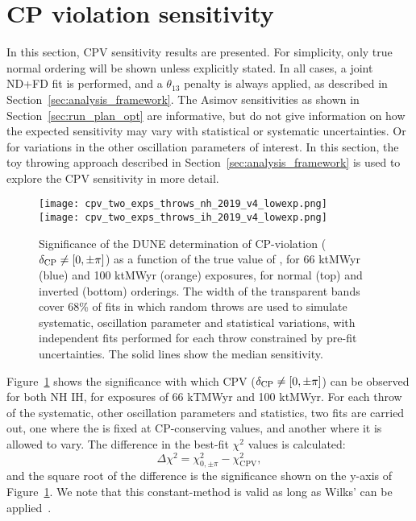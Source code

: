 \FloatBarrier
\section{CP violation sensitivity}
\label{sec:cp_sens}

In this section, CPV sensitivity results are presented. For simplicity, only true normal ordering will be shown unless explicitly stated. In all cases, a joint ND+FD fit is performed, and a $\theta_{13}$ penalty is always applied, as described in Section~\ref{sec:analysis_framework}. The Asimov sensitivities as shown in Section~\ref{sec:run_plan_opt} are informative, but do not give information on how the expected sensitivity may vary with statistical or systematic uncertainties. Or for variations in the other oscillation parameters of interest. In this section, the toy throwing approach described in Section~\ref{sec:analysis_framework} is used to explore the CPV sensitivity in more detail.

\begin{figure}[htbp]
  \centering
  \texttt{[image: cpv\_two\_exps\_throws\_nh\_2019\_v4\_lowexp.png]}\\
  \texttt{[image: cpv\_two\_exps\_throws\_ih\_2019\_v4\_lowexp.png]}
  \caption{Significance of the DUNE determination of CP-violation ($\delta_{\rm CP} \neq [0,\pm\pi]$) as a function of the true value of \deltacp, for 66 ktMWyr (blue) and 100 ktMWyr (orange) exposures, for normal (top) and inverted (bottom) orderings. The width of the transparent bands cover 68\% of fits in which random throws are used to simulate systematic, oscillation parameter and statistical variations, with independent fits performed for each throw constrained by pre-fit uncertainties. The solid lines show the median sensitivity.}
  \label{fig:cpv_bands}
\end{figure}
Figure~\ref{fig:cpv_bands} shows the significance with which CPV ($\delta_{\rm CP} \neq [0, \pm\pi]$) can be observed for both NH IH, for exposures of 66 kTMWyr and 100 ktMWyr. For each throw of the systematic, other oscillation parameters and statistics, two fits are carried out, one where the \deltacp is fixed at CP-conserving values, and another where it is allowed to vary. The difference in the best-fit $\chi^{2}$ values is calculated:
\begin{equation}
  \Delta\chi^{2} = \chi^{2}_{0,\pm\pi} - \chi^{2}_{\mathrm{CPV}},
  \label{eq:cpv_chi2}
\end{equation}
\noindent and the square root of the difference is the significance shown on the y-axis of Figure~\ref{fig:cpv_bands}. We note that this constant-\dchisq method is valid as long as Wilks' can be applied~\cite{wilks}.

